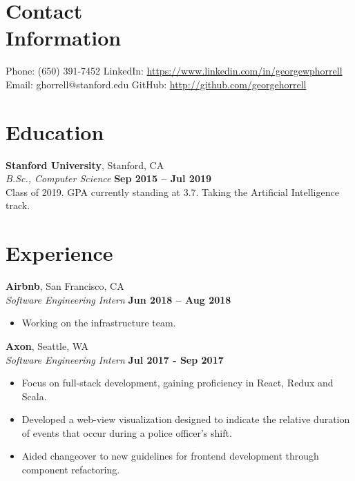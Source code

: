 \documentclass[margin,line]{resume-template}
\begin{document}
\begin{resume}
    \section{\mysidestyle Contact\\Information}

    Phone: (650) 391-7452       \hfill LinkedIn: \url{https://www.linkedin.com/in/georgewphorrell} \\
    \noindent Email: ghorrell@stanford.edu  \hfill GitHub: \url{http://github.com/georgehorrell} \vspace{0mm}\\\vspace{-4.5mm}

    \section{\mysidestyle Education}

    \textbf{Stanford University}, Stanford, CA \vspace{2mm}\\\vspace{1mm}%
    \textsl{B.Sc., Computer Science} \hfill \textbf{Sep 2015 -- Jul 2019}\\
    Class of 2019. GPA currently standing at 3.7. Taking the Artificial Intelligence track.

    \section{\mysidestyle Experience}
    
    \textbf{Airbnb}, San Francisco, CA \vspace{2mm}\\\vspace{1mm}%
    \textsl{Software Engineering Intern} \hfill \textbf{Jun 2018 -- Aug 2018}
    \begin{itemize}
    \item Working on the infrastructure team.
	\end{itemize}
    
    \textbf{Axon}, Seattle, WA \vspace{2mm}\\\vspace{1mm}%
    \textsl{Software Engineering Intern} \hfill \textbf{Jul 2017 - Sep 2017}
    \begin{itemize}
    \item Focus on full-stack development, gaining proficiency in React, Redux and Scala. 
	\item Developed a web-view visualization designed to indicate the relative duration of events that occur during a police officer's shift.
    \item Aided changeover to new guidelines for frontend development through component refactoring.
	\end{itemize}
    

\end{resume}
\end{document}
